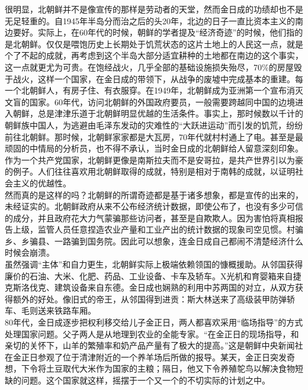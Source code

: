 \begin{multicols}{\theparacolNo}
很明显，北朝鲜并不是像宣传的那样是劳动者的天堂，然而金日成的功绩却也不是无足轻重的。自1945年半岛分而治之后的头20年，北边的日子一直比资本主义的南边要好。实际上，在60年代的时候，朝鲜的学者提及“经济奇迹”的时候，他们指的是北朝鲜。仅仅是喂饱历史上长期处于饥荒状态的这片土地上的人民这一点，就是个了不起的成就，再考虑到这个半岛大部分适宜耕种的土地都在南边的这个事实，这一点就更尤为可贵。在饱经战火，几乎全部的基础设施损失殆尽，70\%的房屋毁于战火，这样一个国家，在金日成的带领下，从战争的废墟中完成基本的重建。每一个北朝鲜人，有房子住、有衣服穿。在1949年，北朝鲜成为亚洲第一个宣布消灭文盲的国家。60年代，访问北朝鲜的外国政府要员，一般需要跨越同中国的边境进入朝鲜，总是津津乐道于北朝鲜明显优越的生活条件。事实上，那时候数以千计的朝鲜族中国人，为逃避由毛泽东发动的灾难性的“大跃进运动”而引发的饥荒，纷纷前往北朝鲜。那时候，北朝鲜家家都是大瓦房，70年代就村村通上了电。甚至是最顽固的中情局的分析员，也不得不承认，当时金日成的北朝鲜给人留意深刻印象。\\

作为一个共产党国家，北朝鲜更像是南斯拉夫而不是安哥拉，是共产世界引以为豪的例子。人们往往喜欢用北朝鲜取得的成就，特别是相对于南韩的成就，以证明社会主义的优越性。\\

然而真的是这样的吗？北朝鲜的所谓奇迹都是基于诸多想象，都是宣传的出来的，未经证实的。北朝鲜政府从来不公布经济统计数据，即使公布了，也没有多少可信的成分，并且政府花大力气蒙骗那些访问者，甚至是自欺欺人。因为害怕将真相报告上级，监管人员任意捏造农业产量和工业产出的统计数据的现象司空见惯。村骗乡、乡骗县、一路骗到国务院。因此可以想象，连金日成自己都闹不清楚经济什么时候会崩溃。\\

虽然强调“主体”和自力更生，北朝鲜实际上极端依赖领国的慷概援助。从邻国获得廉价的石油、大米、化肥、药品、工业设备、卡车及轿车。X光机和育婴箱来自捷克斯洛伐克、建筑设备来自东德。金日成也娴熟的利用中苏两国的对立，从双方获得额外的好处。像旧式的帝王，从邻国得到进贡：斯大林送来了高级装甲防弹轿车、毛则送来铁路车厢。\\

80年代，金日成逐步把权利移交给儿子金正日，两人都喜欢采用“临场指导”的方式处理国家问题。父子两人是从地理到农业的全能专家。“在金正日的现场指导，和亲切的关怀下，山羊的繁殖率和奶产品产量有了极大的提高。”这是朝鲜中央新闻社在金正日参观了位于清津附近的一个养羊场后所做的报导。某天，金正日突发奇想，下令将土豆取代大米作为国家的主粮；隔日，他又下令养殖鸵鸟以解决食物短缺的问题。这个国家就这样，摇摆于一个又一个的不切实际的计划之中。\\


\end{multicols}
